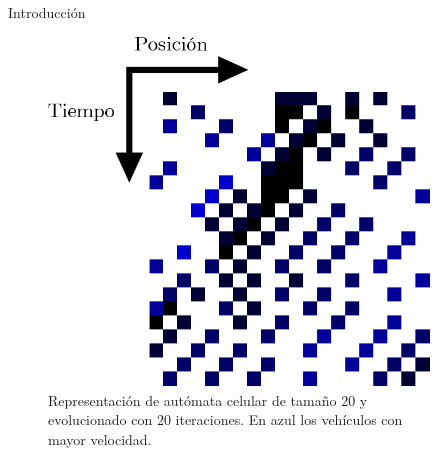 \documentclass[final]{beamer}
\newlength{\sepwid}
\newlength{\onecolwid}
\newlength{\twocolwid}
\begin{document}
\begin{frame}[t]
\begin{columns}[t]
\begin{column}{\onecolwid}
\begin{block}{Introducción}
\end{block}


\begin{figure}
\includegraphics[width=0.8\linewidth]{img/ca_flechas}
\caption{Representación de autómata celular de tamaño $20$ y evolucionado con $20$ iteraciones. En azul los vehículos con mayor velocidad.}
\end{figure}


\end{column} %

\begin{column}{\sepwid}\end{column} %

\begin{column}{\twocolwid} %

\begin{columns}[t,totalwidth=\twocolwid] %

\begin{column}{\onecolwid}\vspace{-.6in} %



\end{column}
\end{columns}
\end{column}
\end{columns}
\end{frame}
\end{document}
